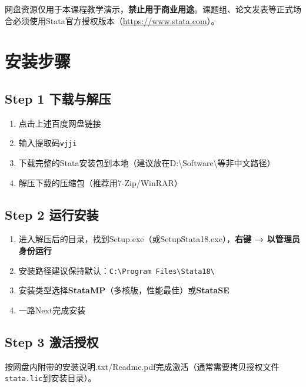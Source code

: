 \begin{warningbox}[版权声明]
网盘资源仅用于本课程教学演示，\textbf{禁止用于商业用途}。课题组、论文发表等正式场合必须使用Stata官方授权版本（\url{https://www.stata.com}）。
\end{warningbox}

\section{安装步骤}

\subsection{Step 1 下载与解压}

\begin{enumerate}[leftmargin=2em]
  \item 点击上述百度网盘链接
  \item 输入提取码\texttt{vjji}
  \item 下载完整的Stata安装包到本地（建议放在D:\textbackslash Software\textbackslash{}等非中文路径）
  \item 解压下载的压缩包（推荐用7-Zip/WinRAR）
\end{enumerate}

\subsection{Step 2 运行安装}

\begin{enumerate}[leftmargin=2em]
  \item 进入解压后的目录，找到Setup.exe（或SetupStata18.exe），\textbf{右键 → 以管理员身份运行}
  \item 安装路径建议保持默认：\texttt{C:\textbackslash Program Files\textbackslash Stata18\textbackslash}
  \item 安装类型选择\textbf{StataMP}（多核版，性能最佳）或\textbf{StataSE}
  \item 一路Next完成安装
\end{enumerate}

\subsection{Step 3 激活授权}

按网盘内附带的安装说明.txt/Readme.pdf完成激活（通常需要拷贝授权文件\texttt{stata.lic}到安装目录）。


